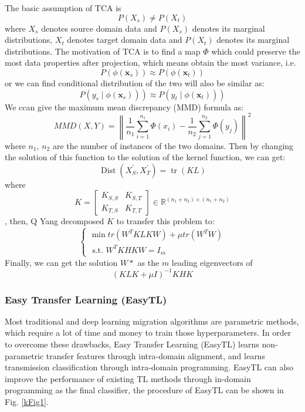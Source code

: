 \documentclass[conference]{IEEEtran}
\begin{document}
The basic assumption of TCA is 
$$P\left(X_{s}\right) \neq P\left(X_{t}\right)$$
where $X_{s}$ denotes source domain data and $P\left(X_{s}\right)$ denotes its marginal distributions, $X_{t}$ denotes target domain data and $P\left(X_{t}\right)$ denotes its marginal distributions. The motivation of TCA is to find a map $\Phi$ which could preserve the most data properties after projection, which means obtain the most variance, i.e.
$$P\left(\phi\left(\mathbf{x}_{s}\right)\right) \approx P\left(\phi\left(\mathbf{x}_{t}\right)\right)$$
or we can find conditional distribution of the two will also be similar as:
$$
\left.\left.P\left(y_{s} \mid \phi\left(\mathbf{x}_{s}\right)\right)\right) \approx P\left(y_{t} \mid \phi\left(\mathbf{x}_{t}\right)\right)\right)
$$
We ccan give the maximum mean discrepancy (MMD) formula as:
$$
M M D(X, Y)=\left\|\frac{1}{n_{1}} \sum_{i=1}^{n_{1}} \Phi\left(x_{i}\right)-\frac{1}{n_{2}} \sum_{j=1}^{n_{2}} \Phi\left(y_{j}\right)\right\|^{2}
$$
where $n_1$, $n_2$ are the number of instances of the two domains. Then by changing the solution of this function to the solution of the kernel function, we can get: 
$$
\operatorname{Dist}\left(X_{S}^{\prime}, X_{T}^{\prime}\right)=\operatorname{tr}(K L)
$$
where
$$
K=\left[\begin{array}{ll}
K_{S, S} & K_{S, T} \\
K_{T, S} & K_{T, T}
\end{array}\right] \in \mathbb{R}^{\left(n_{1}+n_{2}\right) \times\left(n_{1}+n_{2}\right)}
$$,
then, Q Yang\cite{Sinno2011Domain} decomposed $K$ to transfer this problem to:
$$
\left\{\begin{array}{l}
\min t r\left(W^{T} K L K W\right)+\mu t r\left(W^{T} W\right) \\
\text { s.t. } W^{T} K H K W=I_{m}
\end{array}\right.
$$
Finally, we can get the solution $W*$ as the $m$ leading eigenvectors of
$$
(K L K+\mu I)^{-1} K H K
$$

\subsubsection{Easy Transfer Learning (EasyTL)}

Most traditional and deep learning migration algorithms are parametric methods, which require a lot of time and money to train those hyperparameters. In order to overcome these drawbacks, Easy Transfer Learning (EasyTL) \cite{Wang2019Easy} learns non-parametric transfer features through intra-domain alignment, and learns transmission classification through intra-domain programming. EasyTL can also improve the performance of existing TL methods through in-domain programming as the final classifier, the procedure of EasyTL can be shown in Fig. \ref{kFig1}. 
\end{document}
